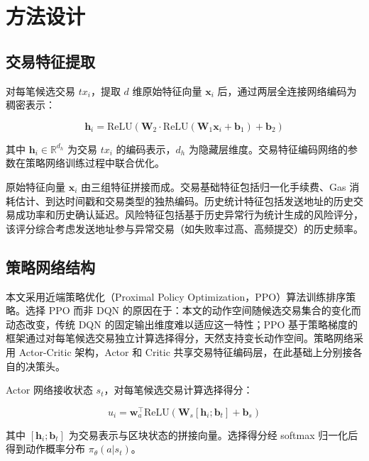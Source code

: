 
\section{方法设计}

\subsection{交易特征提取}

对每笔候选交易 $tx_i$，提取 $d$ 维原始特征向量 $\mathbf{x}_i$ 后，通过两层全连接网络编码为稠密表示：

\begin{equation}
  \mathbf{h}_i = \text{ReLU}(\mathbf{W}_2 \cdot \text{ReLU}(\mathbf{W}_1 \mathbf{x}_i + \mathbf{b}_1) + \mathbf{b}_2)
\end{equation}

其中 $\mathbf{h}_i \in \mathbb{R}^{d_h}$ 为交易 $tx_i$ 的编码表示，$d_h$ 为隐藏层维度。交易特征编码网络的参数在策略网络训练过程中联合优化。

原始特征向量 $\mathbf{x}_i$ 由三组特征拼接而成。交易基础特征包括归一化手续费、Gas 消耗估计、到达时间戳和交易类型的独热编码。历史统计特征包括发送地址的历史交易成功率和历史确认延迟。风险特征包括基于历史异常行为统计生成的风险评分，该评分综合考虑发送地址参与异常交易（如失败率过高、高频提交）的历史频率。

\subsection{策略网络结构}

本文采用近端策略优化（Proximal Policy Optimization，PPO）\cite{schulman2017ppo}算法训练排序策略。选择 PPO 而非 DQN\cite{mnih2015dqn} 的原因在于：本文的动作空间随候选交易集合的变化而动态改变，传统 DQN 的固定输出维度难以适应这一特性；PPO 基于策略梯度的框架通过对每笔候选交易独立计算选择得分，天然支持变长动作空间。策略网络采用 Actor-Critic 架构，Actor 和 Critic 共享交易特征编码层，在此基础上分别接各自的决策头。

Actor 网络接收状态 $s_t$，对每笔候选交易计算选择得分：

\begin{equation}
  u_i = \mathbf{w}_a^\top \text{ReLU}(\mathbf{W}_s [\mathbf{h}_i; \mathbf{b}_t] + \mathbf{b}_s)
\end{equation}

其中 $[\mathbf{h}_i; \mathbf{b}_t]$ 为交易表示与区块状态的拼接向量。选择得分经 softmax 归一化后得到动作概率分布 $\pi_\theta(a|s_t)$。

